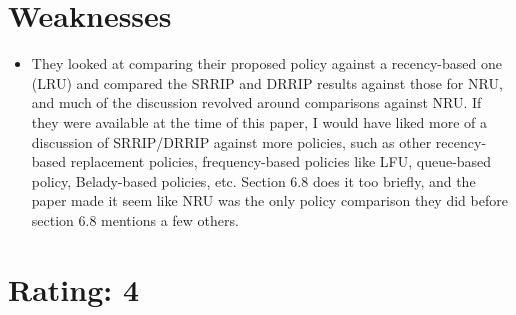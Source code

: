 \documentclass [12pt]{article}
\begin{document}
    \section{Weaknesses} %
    \label{sec:weaknesses}
        \begin{itemize}
            \item They looked at comparing their proposed policy against a recency-based one (LRU) and compared the SRRIP and DRRIP results against those for NRU, and much of the discussion revolved around comparisons against NRU. If they were available at the time of this paper, I would have liked more of a discussion of SRRIP/DRRIP against more policies, such as other recency-based replacement policies, frequency-based policies like LFU, queue-based policy, Belady-based policies, etc. Section 6.8 does it too briefly, and the paper made it seem like NRU was the only policy comparison they did before section 6.8 mentions a few others.
            
        \end{itemize}

    \section{Rating: 4} %
    \label{sec:rating}
     


\end{document}
